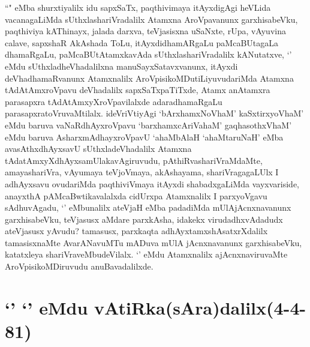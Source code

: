 \begin{artha}
``\stext" eMba shurxtiyalilx idu sapxSaTx, paqthivimaya itAyxdigAgi heVLida vacanagaLiMda sUthxlashariVradalilx Atamxna AroVpavanunx garxhisabeVku, paqthiviya kAThinayx, jalada darxva, teVjasisxna uSaNxte, rUpa, vAyuvina calave, sapxshaR AkAshada ToLu, itAyxdidhamARgaLu paMcaBUtagaLa dhamaRgaLu, paMcaBUtAtamxkavAda sUthxlashariVradalilx kANutatxve, `\stext' eMdu sUthxladheVhadalilxna manuSayxSatavxvanunx, \stext itAyxdi deVhadhamaRvanunx Atamxnalilx AroVpisikoMDutiLiyuvudariMda Atamxna tAdAtAmxroVpavu deVhadalilx sapxSaTxpaTiTxde, Atamx anAtamxra parasapxra tAdAtAmxyXroVpavilalxde adaradhamaRgaLu parasapxratoVruvaMtilalx. ideVriVtiyAgi `bArxhamxNoVhaM' kaSxtirxyoVhaM' eMdu baruva vaNaRdhAyxroVpavu `barxhamxcAriVahaM' gaqhasothxV\s haM' eMdu baruva AsharxmAdhayxroVpavU `ahaMbAlaH `ahaMtaruNaH' eMba avasAthxdhAyxsavU sUthxladeVhadalilx Atamxna tAdatAmxyXdhAyxsamUlakavAgiruvudu, pAthiRvashariVraMdaMte, amayashariVra, vAyumaya  teVjoVmaya, akAshayama, shariVragagaLUlx I adhAyxsavu ovudariMda paqthiviVmaya itAyxdi shabadxgaLiMda vayxvariside, anayxthA pAMcaBwtikavalalxda cidUrxpa Atamxnalilx I parxyoVgavu sAdhuvAgadu, `\stext' eMbunalilx ateVjaH eMba padadiMda mUlAjAcnxnavanunx garxhisabeVku, teVjasusx aMdare parxkAsha, idakekx virudadhxvAdadudx ateVjasusx yAvudu? tamasusx, parxkaqta adhAyxtamxshAsatxrXdalilx tamasisxnaMte AvarANavuMTu mADuva mUlA jAcnxnavanunx garxhisabeVku, katatxleya shariVraveMbudeVilalx. `\stext' eMdu Atamxnalilx ajAcnxnaviruvaMte AroVpisikoMDiruvudu anuBavadalilxde.
\end{artha}

\section*{`\stext' `\stext' eMdu vAtiRka(sAra)dalilx(4-4-81)}


